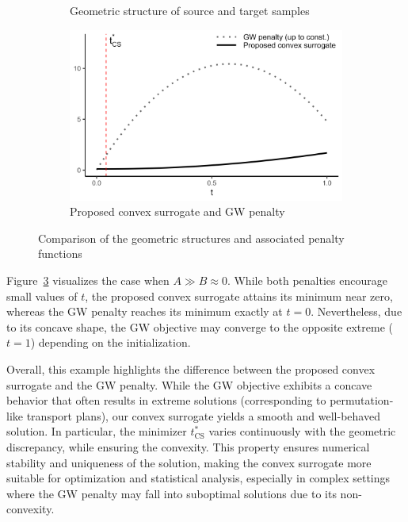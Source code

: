 \documentclass{article}
\begin{document}
\begin{figure}[t]
\begin{subfigure}[t]{0.49\textwidth}
		\caption{Geometric structure of source and target samples}
		\label{fig:motivating-geometry}
	\end{subfigure}
	\begin{subfigure}[t]{0.49\textwidth}
		\centering
		\includegraphics[width=\textwidth]{../simulation/convex_vs_gw.png}
		\caption{Proposed convex surrogate and GW penalty}
		\label{fig:motivating-penalty-trajectory}
	\end{subfigure}
	\caption{Comparison of the geometric structures and associated penalty functions}
	\label{fig:motivating-example}
\end{figure}
Figure~\ref{fig:motivating-example} visualizes the case when $A \gg B \approx 0$. While both penalties encourage small values of $t$, the proposed convex surrogate attains its minimum near zero, whereas the GW penalty reaches its minimum exactly at $t = 0$. Nevertheless, due to its concave shape, the GW objective may converge to the opposite extreme ($t = 1$) depending on the initialization.

Overall, this example highlights the difference between the proposed convex surrogate and the GW penalty. While the GW objective exhibits a concave behavior that often results in extreme solutions (corresponding to permutation-like transport plans), our convex surrogate yields a smooth and well-behaved solution. In particular, the minimizer $t_{\mathrm{CS}}^\ast$ varies continuously with the geometric discrepancy, while ensuring the convexity. This property ensures numerical stability and uniqueness of the solution, making the convex surrogate more suitable for optimization and statistical analysis, especially in complex settings where the GW 
penalty may fall into suboptimal solutions due to its non-convexity.
\end{document}
